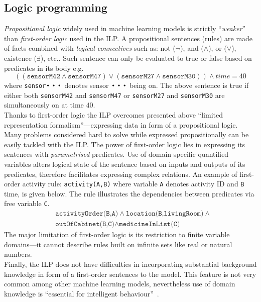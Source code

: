 \documentclass[10pt, a4paper, pdflatex, leqno, twoside, openright]{report}
\DeclareMathOperator*{\Bigcdot}{\scalerel*{\cdot}{\bigodot}}
\begin{document}
    \subsection{Logic programming}
\emph{Propositional logic} widely used in machine learning models is strictly ``\emph{weaker}'' than \emph{first-order logic} used in the ILP. A propositional sentences (rules) are made of facts combined with \emph{logical connectives} such as: not ($\neg$), and ($\land$), or ($\lor$), existence ($\exists$), etc.. Such sentence can only be evaluated to true or false based on predicates in its body e.g.\
$$\left(\left(\texttt{sensorM42} \land \texttt{sensorM47}\right) \lor \left(\texttt{sensorM27} \land \texttt{sensorM30}\right)\right) \land time = 40$$
where \texttt{sensor$\Bigcdot\Bigcdot\Bigcdot$} denotes sensor $\Bigcdot\Bigcdot\Bigcdot$ being on. The above sentence is true if either both \texttt{sensorM42} and \texttt{sensorM47} or \texttt{sensorM27} and \texttt{sensorM30} are simultaneously on at time $40$.\\

Thanks to first-order logic the ILP overcomes presented above ``limited representation formalism''---expressing data in form of a propositional logic. Many problems considered hard to solve while expressed propositionally can be easily tackled with the ILP. The power of first-order logic lies in expressing its sentences with \emph{parametrised} predicates. Use of domain specific quantified variables alters logical state of the sentence based on inputs and outputs of its predicates, therefore facilitates expressing complex relations. An example of first-order activity rule: \texttt{activity(A,B)} where variable \texttt{A} denotes activity ID and \texttt{B} time, is given below. The rule illustrates the dependencies between predicates via free variable \texttt{C}.
\begin{eqnarray*}
&\texttt{activityOrder(B,A)} \land \texttt{location(B,livingRoom)} \land \\
&\texttt{outOfCabinet(B,C)} \land \texttt{medicineInList(C)}
\end{eqnarray*}
The major limitation of first-order logic is its restriction to finite variable domains---it cannot describe rules built on infinite sets like real or natural numbers.\\

Finally, the ILP does not have difficulties in incorporating substantial background knowledge in form of a first-order sentences to the model. This feature is not very common among other machine learning models, nevertheless use of domain knowledge is ``essential for intelligent behaviour''~\citep{muggleton1994inductive}.
\end{document}
